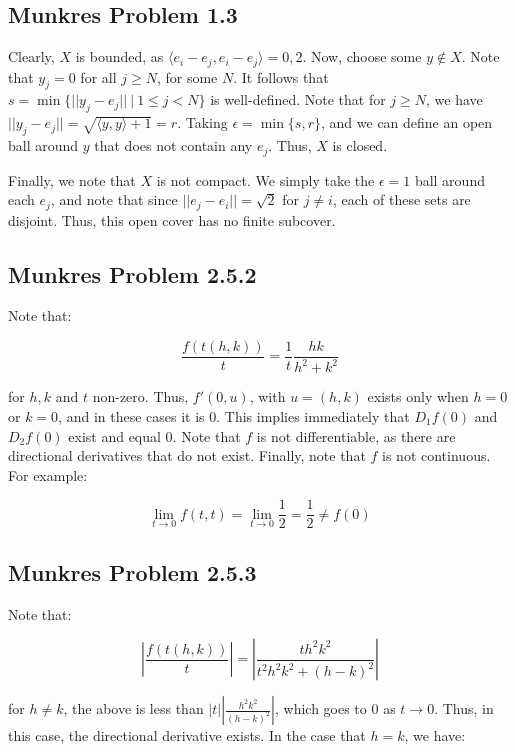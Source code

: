 \documentclass[10pt, oneside]{amsart}
\begin{document}
    \subsection{Munkres Problem 1.3} Clearly, $X$ is bounded, as $\langle e_i - e_j, e_i - e_j \rangle = 0, 2$. Now, choose some $y \notin X$. Note that $y_j = 0$ for all $j \geq N$, for some $N$. It follows that
    $s = \min \{ ||y_j - e_j|| \ | \ 1 \leq j < N \}$ is well-defined. Note that for $j \geq N$, we have $||y_j - e_j|| = \sqrt{ \langle y, y \rangle + 1} = r$. Taking $\epsilon = \min \{s, r\}$, and we can define an open ball
    around $y$ that does not contain any $e_j$. Thus, $X$ is closed.
    \newline

    Finally, we note that $X$ is not compact. We simply take the $\epsilon = 1$ ball around each $e_j$, and note that since $||e_j - e_i|| = \sqrt{2}$ for $j \neq i$, each of these sets are disjoint. Thus, this open
    cover has no finite subcover.

    \subsection{Munkres Problem 2.5.2}

    Note that:

    $$\frac{f(t(h, k))}{t} = \frac{1}{t} \frac{hk}{h^2 + k^2}$$

    for $h, k$ and $t$ non-zero. Thus, $f'(0, u)$, with $u = (h, k)$ exists only when $h = 0$ or $k = 0$, and in these cases it is $0$. This implies immediately
    that $D_1 f(0)$ and $D_2 f(0)$ exist and equal $0$. Note that $f$ is not differentiable, as there are directional derivatives that do not exist. Finally, note that $f$ is not continuous.
    For example:

    $$\lim_{t \rightarrow 0} f(t, t) = \lim_{t \to 0} \frac{1}{2} = \frac{1}{2} \neq f(0)$$

    \subsection{Munkres Problem 2.5.3}

    Note that:

    $$\left| \frac{f(t(h, k))}{t} \right| = \left| \frac{t h^2 k^2}{t^2 h^2 k^2 + (h - k)^2} \right|$$

    for $h \neq k$, the above is less than $|t| \left| \frac{h^2 k^2}{(h - k)^2} \right|$, which goes to $0$ as $t \rightarrow 0$. Thus, in this case, the directional derivative exists. In the case that $h = k$, we have:
\end{document}
